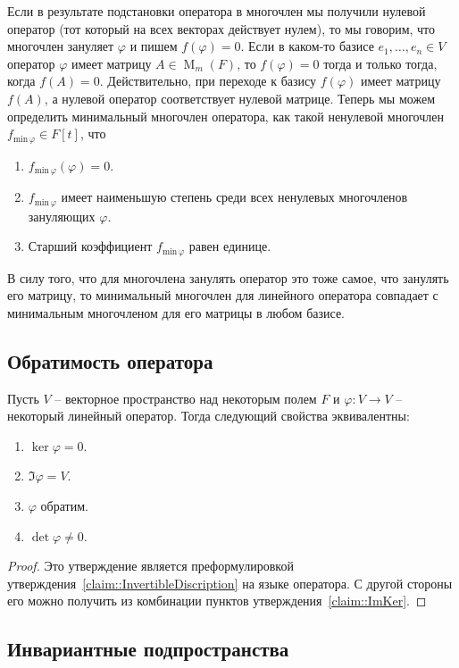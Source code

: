 Если в результате подстановки оператора в многочлен мы получили нулевой оператор (тот который на всех векторах действует нулем), то мы говорим, что многочлен зануляет $\varphi$ и пишем $f(\varphi) = 0$.
Если в каком-то базисе $e_1,\ldots,e_n\in V$ оператор $\varphi$ имеет матрицу $A\in \operatorname{M}_{m}(F)$, то $f(\varphi) = 0$ тогда и только тогда, когда $f(A) = 0$.
Действительно, при переходе к базису $f(\varphi)$ имеет матрицу $f(A)$, а нулевой оператор соответствует нулевой матрице.
Теперь мы можем определить минимальный многочлен оператора, как такой ненулевой многочлен $f_{\text{min}\,\varphi}\in F[t]$, что
\begin{enumerate}
\item $f_{\text{min}\,\varphi}(\varphi) = 0$.
\item $f_{\text{min}\,\varphi}$ имеет наименьшую степень среди всех ненулевых многочленов зануляющих $\varphi$.
\item Старший коэффициент $f_{\text{min}\,\varphi}$ равен единице.
\end{enumerate}
В силу того, что для многочлена занулять оператор это тоже самое, что занулять его матрицу, то минимальный многочлен для линейного оператора совпадает с минимальным многочленом для его матрицы в любом базисе.

\subsection{Обратимость оператора}

\begin{claim}
\label{claim::OperatorInvert}
Пусть $V$ -- векторное пространство над некоторым полем $F$ и $\varphi\colon V\to V$ -- некоторый линейный оператор.
Тогда следующий свойства эквивалентны:
\begin{enumerate}
\item $\ker \varphi = 0$.
\item $\Im \varphi = V$.
\item $\varphi$ обратим.
\item $\det \varphi \neq 0$.
\end{enumerate}
\end{claim}
\begin{proof}
Это утверждение является преформулировкой утверждения~\ref{claim::InvertibleDiscription} на языке оператора.
С другой стороны его можно получить из комбинации пунктов утверждения~\ref{claim::ImKer}.
\end{proof}

\subsection{Инвариантные подпространства}

